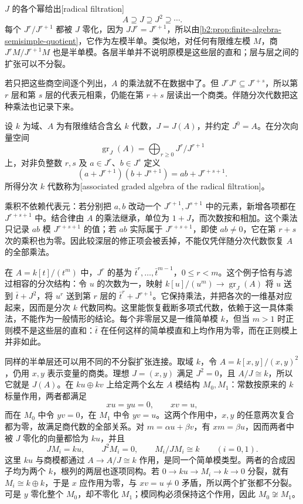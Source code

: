 \ProseParagraphBreak
\(J\) 的各个幂给出[radical filtration]
\[
	A\supseteq J\supseteq J^2\supseteq\cdots.
\]
每个 \(J^r/J^{r+1}\) 都被 \(J\) 零化，因为 \(J J^r=J^{r+1}\)，所以由\cref{b2:prop:finite-algebra-semisimple-quotient}，它作为左模半单。类似地，对任何有限维左模 \(M\)，商 \(J^rM/J^{r+1}M\) 也是半单模。各层半单并不说明原模是这些层的直和；层与层之间的扩张可以不分裂。

\ProseParagraphBreak
若只把这些商空间逐个列出，\(A\) 的乘法就不在数据中了。但 \(J^rJ^s\subseteq J^{r+s}\)，所以第 \(r\) 层和第 \(s\) 层的代表元相乘，仍能在第 \(r+s\) 层读出一个商类。伴随分次代数把这种乘法也记录下来。

\begin{definition}\label{b2:def:associated-radical-algebra}
	设 \(k\) 为域、\(A\) 为有限维结合含幺 \(k\) 代数，\(J=J(A)\)，并约定 \(J^0=A\)。在分次向量空间
	\[
		\operatorname{gr}_J(A)=\bigoplus_{r\ge0}J^r/J^{r+1}
	\]
	上，对非负整数 \(r,s\) 及 \(a\in J^r\)、\(b\in J^s\) 定义
	\[
		(a+J^{r+1})(b+J^{s+1})=ab+J^{r+s+1}.
	\]
	所得分次 \(k\) 代数称为[associated graded algebra of the radical filtration]。
\end{definition}

乘积不依赖代表元：若分别把 \(a,b\) 改动一个 \(J^{r+1},J^{s+1}\) 中的元素，新增各项都在 \(J^{r+s+1}\) 中。结合律由 \(A\) 的乘法继承，单位为 \(1+J\)，而次数按和相加。这个乘法只记录 \(ab\) 模 \(J^{r+s+1}\) 的值；若 \(ab\) 实际属于 \(J^{r+s+1}\)，即使 \(ab\ne0\)，它在第 \(r+s\) 次的乘积也为零。因此较深层的修正项会被丢掉，不能仅凭伴随分次代数恢复 \(A\) 的全部乘法。

\ProseParagraphBreak
在 \(A=k[t]/(t^m)\) 中，\(J^r\) 的基为 \(\bar t^r,\ldots,\bar t^{m-1}\)，\(0\le r<m\)。这个例子恰有与滤过相容的分次结构：令 \(u\) 的次数为一，映射 \(k[u]/(u^m)\to\operatorname{gr}_J(A)\) 将 \(u\) 送到 \(\bar t+J^2\)，将 \(u^r\) 送到第 \(r\) 层的 \(\bar t^r+J^{r+1}\)。它保持乘法，并把各次的一维基对应起来，因而是分次 \(k\) 代数同构。这里能恢复截断多项式代数，依赖于这一具体乘法，不能作为一般情形的结论。每个非零层又是一维简单模 \(k\)，但当 \(m>1\) 时正则模不是这些层的直和：\(\bar t\) 在任何这样的简单模直和上均作用为零，而在正则模上并非如此。

\ProseParagraphBreak
同样的半单层还可以用不同的不分裂扩张连接。取域 \(k\)，令 \(A=k[x,y]/(x,y)^2\)，仍用 \(x,y\) 表示变量的商类。理想 \(J=(x,y)\) 满足 \(J^2=0\)，且 \(A/J\cong k\)，所以它就是 \(J(A)\)。在 \(ku\oplus kv\) 上给定两个幺左 \(A\) 模结构 \(M_0,M_1\)：常数按原来的 \(k\) 标量作用，两者都满足
\[
	xu=yu=0,\qquad xv=u,
\]
而在 \(M_0\) 中令 \(yv=0\)，在 \(M_1\) 中令 \(yv=u\)。这两个作用中，\(x,y\) 的任意两次复合都为零，故满足商代数的全部关系。对 \(m=\alpha u+\beta v\)，有 \(xm=\beta u\)，因而两者中被 \(J\) 零化的向量都恰为 \(ku\)，并且
\[
	JM_i=ku,\qquad J^2M_i=0,\qquad M_i/JM_i\cong k \qquad(i=0,1).
\]
这里 \(ku\) 与商模都通过 \(A\to A/J\cong k\) 作用，是同一个简单模类型。两者的合成因子均为两个 \(k\)，根列的两层也逐项同构。若 \(0\to ku\to M_i\to k\to0\) 分裂，就有 \(M_i\cong k\oplus k\)，于是 \(x\) 应作用为零，与 \(xv=u\ne0\) 矛盾，所以两个扩张都不分裂。可是 \(y\) 零化整个 \(M_0\)，却不零化 \(M_1\)；模同构必须保持这个作用，因此 \(M_0\not\cong M_1\)。

